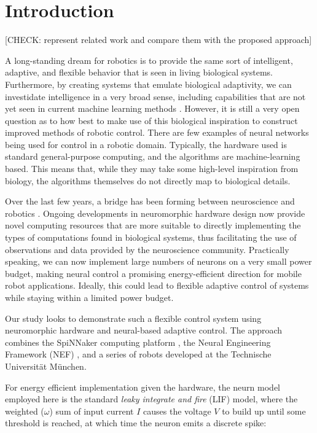 \documentclass[conference]{IEEEtran}
\begin{document}
\IEEEpeerreviewmaketitle


\section{Introduction}

[CHECK: represent related work and compare them with the proposed approach]

A long-standing dream for robotics is to provide the same sort of
intelligent, adaptive, and flexible behavior that is seen in living
biological systems.  Furthermore, by creating systems that emulate
biological adaptivity, we can investidate intelligence in a very broad sense,
including capabilities that are not yet seen in current machine learning
methods \cite{mcfarland1993intelligent}.  However, it is still a very open
question as to how best to make use of this biological inspiration to construct
improved methods of robotic control.  There are few examples of neural networks 
being used for control \cite{janglova2005neural} in a robotic domain. 
Typically, the hardware used is standard general-purpose computing, and the 
algorithms are machine-learning based. This means that, while they may take
some high-level inspiration from biology, the algorithms themselves do not
directly map to biological details.

Over the last few years, a bridge has been forming between neuroscience and 
robotics \cite{webb2000does}. Ongoing developments in neuromorphic hardware 
design now provide novel computing resources that are more suitable to
directly implementing the types of computations found in biological systems, 
thus facilitating the use of observations and data provided by the 
neuroscience community. Practically speaking, we can now implement large numbers of 
neurons on a very small power budget, making neural control a promising 
energy-efficient direction for mobile robot applications.  Ideally, this could
lead to flexible adaptive control of systems while staying within a limited
power budget.

Our study looks to demonstrate such a flexible control system using 
neuromorphic hardware and neural-based adaptive control. The approach 
combines the SpiNNaker computing 
platform \cite{furber2007neural, furber2014spinnaker}, the Neural Engineering 
Framework (NEF)  \cite{eliasmith2004neural}, and a series of robots developed at 
the Technische Universit{\"a}t M{\"u}nchen. 


For energy efficient implementation given the hardware, the neurn model
employed here is the standard \textit{leaky integrate and fire} (LIF) model, 
where the weighted ($\omega$) sum of input current $I$ causes the voltage $V$ to build up until some
threshold is reached, at which time the neuron emits a discrete spike:
\end{document}
